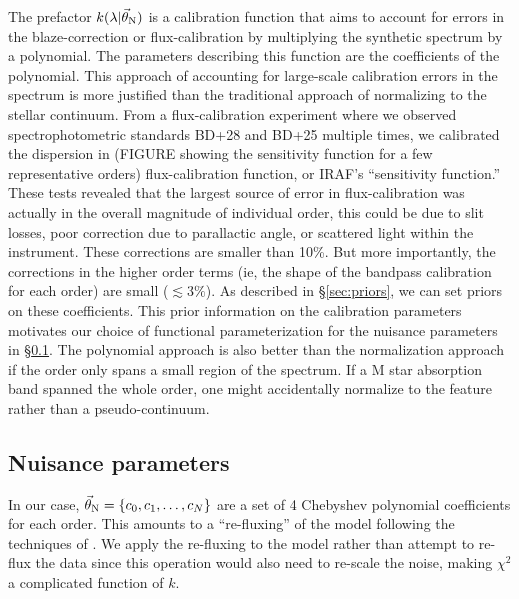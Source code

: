 \documentclass[preprint]{aastex} %
\newcommand{\vt}{\vec{\theta}}
\newcommand{\vN}{\vt_{\rm N}}
\begin{document}
The prefactor $k(\lambda | \vN)$ is a calibration function that aims to account for errors in the blaze-correction or flux-calibration by multiplying the synthetic spectrum by a polynomial. The parameters describing this function are the coefficients of the polynomial. This approach of accounting for large-scale calibration errors in the spectrum is more justified than the traditional approach of normalizing to the stellar continuum. From a flux-calibration experiment where we observed spectrophotometric standards BD+28 and BD+25 multiple times, we calibrated the dispersion in (FIGURE showing the sensitivity function for a few representative orders) flux-calibration function, or IRAF's ``sensitivity function.'' These tests revealed that the largest source of error in flux-calibration was actually in the overall magnitude of individual order, this could be due to slit losses, poor correction due to parallactic angle, or scattered light within the instrument. These corrections are smaller than 10\%. But more importantly, the corrections in the higher order terms (ie, the shape of the bandpass calibration for each order) are small ($\lesssim 3\%$). As described in \S\ref{sec:priors}, we can set priors on these coefficients. This prior information on the calibration parameters motivates our choice of functional parameterization for the nuisance parameters in \S\ref{sec:nuisance}. The polynomial approach is also better than the normalization approach if the order only spans a small region of the spectrum. If a M star absorption band spanned the whole order, one might accidentally normalize to the feature rather than a pseudo-continuum.


\subsection{Nuisance parameters}
\label{sec:nuisance}
In our case, $\vN = \{c_0, c_1, \ldots, c_N\}$ are a set of 4 Chebyshev polynomial coefficients for each order. This amounts to a ``re-fluxing'' of the model following the techniques of \citet{elh+06}. We apply the re-fluxing to the model rather than attempt to re-flux the data since this operation would also need to re-scale the noise, making $\chi^2$ a complicated function of $k$.
\end{document}
